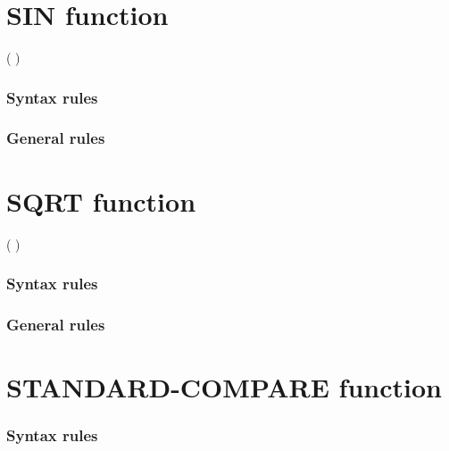 \section{SIN function}

\begin{syntax}
    ( \argument )
\end{syntax}

\subsubsection{Syntax rules}

\subsubsection{General rules}

\section{SQRT function}

\begin{syntax}
    ( \argument )
\end{syntax}

\subsubsection{Syntax rules}

\subsubsection{General rules}

\section{STANDARD-COMPARE function}

\begin{syntax}

  \pending{
    ( \argument \argument
    \begin{0-1}
      \argument
    \end{0-1}
    \begin{0-1}
      \argument
    \end{0-1}
    )
  }
\end{syntax}

\subsubsection{Syntax rules}

